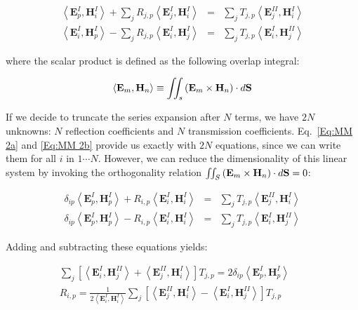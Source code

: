\begin{eqnarray}
\left\langle \mathbf{E}^{I}_{p},\mathbf{H}^{I}_{i}\right\rangle +\sum _{j}R_{j,p}\left\langle \mathbf{E}^{I}_{j},\mathbf{H}^{I}_{i}\right\rangle  & = & \sum _{j}T_{j,p}\left\langle \mathbf{E}^{II}_{j},\mathbf{H}^{I}_{i}\right\rangle \label{Eq:MM 2a} \\
\left\langle \mathbf{E}^{I}_{i},\mathbf{H}^{I}_{p}\right\rangle -\sum _{j}R_{j,p}\left\langle \mathbf{E}^{I}_{i},\mathbf{H}^{I}_{j}\right\rangle  & = & \sum _{j}T_{j,p}\left\langle \mathbf{E}^{I}_{i},\mathbf{H}^{II}_{j}\right\rangle \label{Eq:MM 2b} 
\end{eqnarray}

where the scalar product is defined as the following overlap integral:

\begin{equation} 
\left\langle \mathbf{E}_{m},\mathbf{H}_{n}\right\rangle \equiv \iint _{s}\left( \mathbf{E}_{m}\times \mathbf{H}_{n}\right) \cdot d{\bf S}
\end{equation} 

If we decide to truncate the series expansion after $N$ terms, we have
$2N$ unknowns: $N$ reflection coefficients and $N$ transmission
coefficients. Eq.~\ref{Eq:MM 2a} and \ref{Eq:MM 2b} provide us exactly with
$2N$ equations, since we can write them for all $i$ in $1 \cdots N$.
However, we can reduce the dimensionality of this linear system by invoking
the orthogonality relation $\iint_{S}\left( \mathbf{E}_{m}\times \mathbf{H}_{n}\right) \cdot d{\bf S}=0$:

\begin{eqnarray}
\delta _{ip}\left\langle \mathbf{E}^{I}_{p},\mathbf{H}^{I}_{p}\right\rangle +R_{i,p}\left\langle \mathbf{E}^{I}_{i},\mathbf{H}^{I}_{i}\right\rangle  & = & \sum _{j}T_{j,p}\left\langle \mathbf{E}^{II}_{j},\mathbf{H}^{I}_{i}\right\rangle \label{Eq:MM 3a} \\
\delta _{ip}\left\langle \mathbf{E}^{I}_{p},\mathbf{H}^{I}_{p}\right\rangle -R_{i,p}\left\langle \mathbf{E}^{I}_{i},\mathbf{H}^{I}_{i}\right\rangle  & = & \sum _{j}T_{j,p}\left\langle \mathbf{E}^{I}_{i},\mathbf{H}^{II}_{j}\right\rangle \label{Eq:MM 3b} 
\end{eqnarray}

Adding and subtracting these equations yields:

\begin{eqnarray}
\sum _{j}\left[ \left\langle \mathbf{E}^{I}_{i},\mathbf{H}^{II}_{j}\right\rangle +\left\langle \mathbf{E}^{II}_{j},\mathbf{H}^{I}_{i}\right\rangle \right] T_{j,p}=2\delta _{ip}\left\langle \mathbf{E}^{I}_{p},\mathbf{H}^{I}_{p}\right\rangle  &  & \label{Eq:MM 4a} \\
R_{i,p}=\frac{1}{2\left\langle \mathbf{E}^{I}_{i},\mathbf{H}^{I}_{i}\right\rangle }\sum _{j}\left[ \left\langle \mathbf{E}^{II}_{j},\mathbf{H}^{I}_{i}\right\rangle -\left\langle \mathbf{E}^{I}_{i},\mathbf{H}^{II}_{j}\right\rangle \right] T_{j,p} &  & \label{Eq:MM 4b} 
\end{eqnarray}

